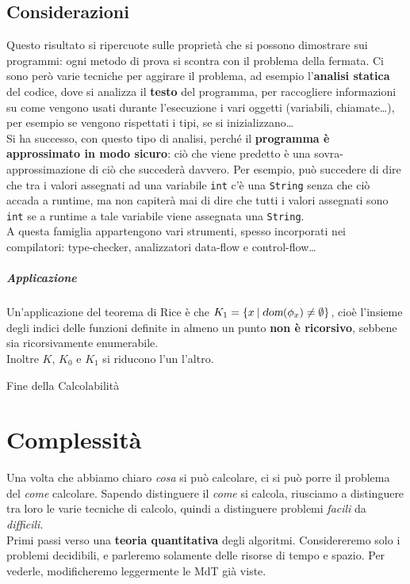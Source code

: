 \documentclass[10pt]{book}
\begin{document}
\section{Considerazioni}
Questo risultato si ripercuote sulle proprietà che si possono dimostrare sui programmi: ogni metodo di prova si scontra con il problema della fermata. Ci sono però varie tecniche per aggirare il problema, ad esempio l'\textbf{analisi statica} del codice, dove si analizza il \textbf{testo} del programma, per raccogliere informazioni su come vengono usati durante l'esecuzione i vari oggetti (variabili, chiamate\ldots), per esempio se vengono rispettati i tipi, se si inizializzano\ldots\\
Si ha successo, con questo tipo di analisi, perché il \textbf{programma è approssimato in modo sicuro}: ciò che viene predetto è una sovra-approssimazione di ciò che succederà davvero. Per esempio, può succedere di dire che tra i valori assegnati ad una variabile \texttt{int} c'è una \texttt{String} senza che ciò accada a runtime, ma non capiterà mai di dire che tutti i valori assegnati sono \texttt{int} se a runtime a tale variabile viene assegnata una \texttt{String}.\\
A questa famiglia appartengono vari strumenti, spesso incorporati nei compilatori: type-checker, analizzatori data-flow e control-flow\ldots
\paragraph{Applicazione} Un'applicazione del teorema di Rice è che $K_1 = \{x\: |\: \textsl{dom}(\phi_x) \neq \emptyset\}$, cioè l'insieme degli indici delle funzioni definite in almeno un punto \textbf{non è ricorsivo}, sebbene sia ricorsivamente enumerabile.\\
Inoltre $K$, $K_0$ e $K_1$ si riducono l'un l'altro.
\begin{center}
Fine della Calcolabilità
\end{center}
\chapter{Complessità}
Una volta che abbiamo chiaro \textit{cosa} si può calcolare, ci si può porre il problema del \textit{come} calcolare. Sapendo distinguere il \textit{come} si calcola, riusciamo a distinguere tra loro le varie tecniche di calcolo, quindi a distinguere problemi \textit{facili} da \textit{difficili}.\\
Primi passi verso una \textbf{teoria quantitativa} degli algoritmi. Considereremo solo i problemi decidibili, e parleremo solamente delle risorse di tempo e spazio. Per vederle, modificheremo leggermente le MdT già viste.
\end{document}
